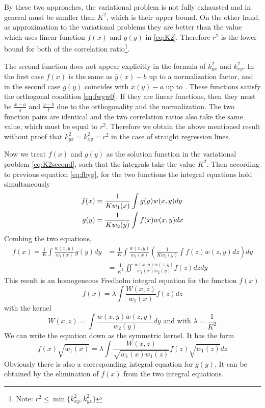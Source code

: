 \documentclass{article}
\begin{document}
By these two approaches, the variational problem is not fully exhausted and in general must be smaller than $K^2$, which
is their upper bound.
On the other hand, as approximation to the variational
problems they are better than the value which uses linear
function $f(x)$ and $g(y)$ in \eqref{eq:K2}.
Therefore $r^2$ is the lower bound for both of
the correlation ratio\footnote{Note: $r^2 \leq \min\{k^2_{xy}, k^2_{yx}\}$}.

The second function does not appear explicitly
in the formula of $k^2_{yx}$
and $k^2_{xy}$. In the first case $f(x)$ is the same as
$\bar{y}(x)-b$ up to a normalization factor, and in the
second case $g(y)$ coincides with $\bar{x}(y)-a$ up to .
These functions satisfy the orthogonal condition
\eqref{eq:fwgw0}. If they are linear functions,
then they must be $\frac{x-a}{s}$
and $\frac{y-b}{t}$ due to the orthogonality and the normalization. The two function pairs are identical and
the two correlation ratios also take the same value,
which must be equal to $r^2$. Therefore we obtain the above
mentioned result without proof that $k^2_{yx}
= k^2_{xy}=r^2$ in the case of straight regression lines.

Now we treat $f(x)$ and $g(y)$ as the solution function
in the variational problem \eqref{eq:K2second}, such that
the integrals take the value $K^2$. Then according to
previous equation \eqref{eq:fbyg}, for the two functions
the integral equations hold simultaneously
\begin{align}
    f(x) &= \frac{1}{K w_1(x)}\int g(y)w(x,y)dy \notag \\
    g(y) &= \frac{1}{K w_2(y)}\int f(x) w(x,y)dx \label{eq:gbyf}
\end{align}
Combing the two equations,
\begin{align*}
    f(x) = \frac{1}{K}
    \int \frac{w(x,y)}{w_1(x)} g(y)dy
    & = \frac{1}{K}
    \int \frac{w(x,y)}{w_1(x)}  (\frac{1}{K w_2(y)}\int f(z) w(z,y)dz )dy \\
    &= \frac{1}{K^2}
    \iint \frac{w(x,y)w(z,y)}{w_1(x)w_2(y)}f(z)dzdy
\end{align*}
This result is an homogeneous Fredholm integral
equation for the function $f(x)$
\begin{equation}\label{eq:fkernel}
    f(x) = \lambda \int \frac{W(x,z)}{w_1(x)}f(z) dz
\end{equation}
with the kernel
$$
W(x,z) = \int \frac{w(x,y)w(z,y)}{w_2(y)} dy
\textrm{ and with } \lambda = \frac{1}{K^2}
$$
We can write the equation down as the symmetric kernel.
It has the form
\begin{equation}\label{eq:18a}
    f(x)\sqrt{w_1(x)}
    =\lambda \int \frac{W(x,z)}{\sqrt{w_1(x) w_1(z)}}
    f(z) \sqrt{w_1(z)}dz
    \tag{18a}
\end{equation}
Obviously there is also a corresponding integral equation
for $g(y)$.
It can be obtained by the elimination of $f(x)$ 
from the two integral equations.
\end{document}

